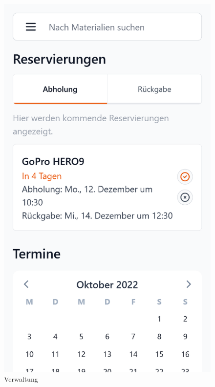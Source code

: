 \begin{figure}[p]
    \centering
    \includegraphics[scale=0.17]{Bilder/Dialgobeispiel/Reservierung Abholung.png}\hspace{1em}
    \caption[Dialogbeispiel 3]{Verwaltung}\label{fig:georg2}
\end{figure}


